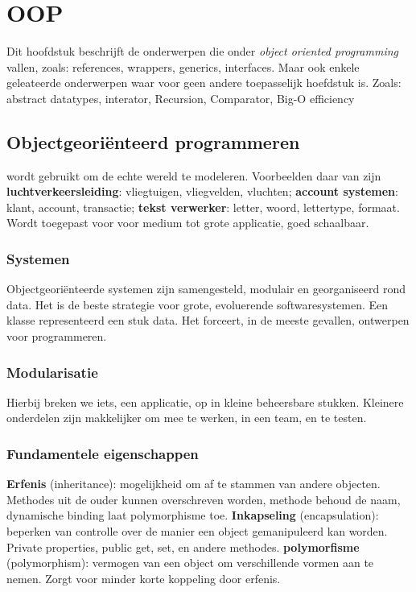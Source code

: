 \section{OOP}
Dit hoofdstuk beschrijft de onderwerpen die onder \textit{object oriented programming} vallen, zoals: references, wrappers, generics, interfaces.
Maar ook enkele geleateerde onderwerpen waar voor geen andere toepasselijk hoefdstuk is. Zoals: abstract datatypes, interator, Recursion, Comparator, Big-O efficiency

\subsection{Objectgeoriënteerd programmeren}
 wordt gebruikt om de echte wereld te modeleren.
Voorbeelden daar van zijn \textbf{luchtverkeersleiding}: vliegtuigen, vliegvelden, vluchten; \textbf{account systemen}: klant, account, transactie; \textbf{tekst verwerker}: letter, woord, lettertype, formaat.
Wordt toegepast voor voor medium tot grote applicatie, goed schaalbaar.

\subsubsection{Systemen}
Objectgeoriënteerde systemen zijn samengesteld, modulair en georganiseerd rond data.
Het is de beste strategie voor grote, evoluerende softwaresystemen.
Een klasse representeerd een stuk data.
Het forceert, in de meeste gevallen, ontwerpen voor programmeren.

\subsubsection{Modularisatie}
Hierbij breken we iets, een applicatie, op in kleine beheersbare stukken.
Kleinere onderdelen zijn makkelijker om mee te werken, in een team, en te testen.

\subsubsection{Fundamentele eigenschappen}
\textbf{Erfenis} (inheritance): mogelijkheid om af te stammen van andere objecten.
Methodes uit de ouder kunnen overschreven worden, methode behoud de naam, dynamische binding laat polymorphisme toe.
\textbf{Inkapseling} (encapsulation): beperken van controlle over de manier een object gemanipuleerd kan worden.
Private properties, public get, set, en andere methodes.
\textbf{polymorfisme} (polymorphism): vermogen van een object om verschillende vormen aan te nemen.
Zorgt voor minder korte koppeling door erfenis.

